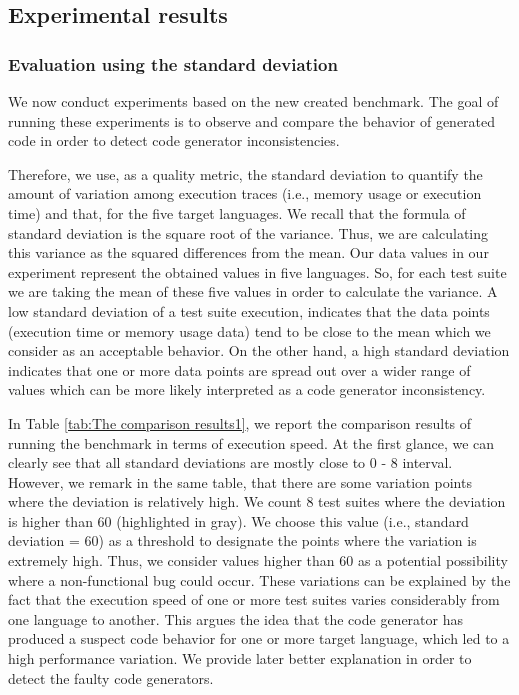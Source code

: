 \subsection{Experimental results}
\subsubsection{Evaluation using the standard deviation}
We now conduct experiments based on the new created benchmark. 
The goal of running these experiments is to observe and compare the behavior of generated code in order to detect code generator inconsistencies.

 
 
Therefore, we use, as a quality metric, the standard deviation to quantify the amount of variation among execution traces (i.e., memory usage or execution time) and that, for the five target languages. We recall that the formula of standard deviation is the square root of the variance. Thus, we are calculating this variance as the squared differences from the mean. Our data values in our experiment represent the obtained values in five languages. So, for each test suite we are taking the mean of these five values in order to calculate the variance.
A low standard deviation of a test suite execution, indicates that the data points (execution time or memory usage data) tend to be close to the mean which we consider as an acceptable behavior.  
On the other hand, a high standard deviation indicates that one or more data points are spread out over a wider range of values which can be more likely interpreted as a code generator inconsistency. 

In Table \ref{tab:The comparison results1}, we report the comparison results of running the benchmark in terms of execution speed. At the first glance, we can clearly see that all standard deviations are mostly close to 0 - 8 interval. However, we remark in the same table, that there are some variation points where the deviation is relatively high. We count 8 test suites where the deviation is higher than 60 (highlighted in gray). We choose this value (i.e., standard deviation = 60) as a threshold to designate the points where the variation is extremely high. Thus, we consider values higher than 60 as a potential possibility where a non-functional bug could occur. These variations can be explained by the fact that the execution speed of one or more test suites varies considerably from one language to another. This argues the idea that the code generator has produced a suspect code behavior for one or more target language, which led to a high performance variation. We provide later better explanation in order to detect the faulty code generators.

